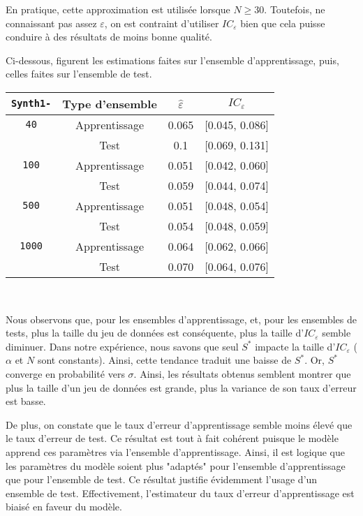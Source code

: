 \documentclass{article}
\begin{document}
\begin{multicols}{2}
En pratique, cette approximation est utilisée lorsque $N \geq 30.$ Toutefois, ne connaissant pas assez $\varepsilon$, on est contraint d'utiliser $IC_\varepsilon$ bien que cela puisse conduire à des résultats de moins bonne qualité.

Ci-dessous, figurent les estimations faites sur l’ensemble d’apprentissage, puis, celles faites sur l’ensemble de test.

{\footnotesize
\begin{center}
\begin{tabular}{| @{}c@{} || @{}c@{} | c | c |}
\hline
\texttt{Synth1-} & Type d'ensemble & $\widehat{\varepsilon}$  & $IC_\varepsilon$  \\
\hline
\hline
\texttt{40} & Apprentissage & 0.065 & [0.045, 0.086] \\
\cline{2-4}
 & Test & 0.1 & [0.069, 0.131] \\
\hline
\hline
\texttt{100} & Apprentissage & 0.051 & [0.042, 0.060] \\
\cline{2-4}
 & Test & 0.059 & [0.044, 0.074] \\
\hline
\hline
\texttt{500} & Apprentissage & 0.051 & [0.048, 0.054] \\
\cline{2-4}
 & Test & 0.054 & [0.048, 0.059] \\
\hline
\hline
\texttt{1000} & Apprentissage & 0.064 & [0.062, 0.066] \\
\cline{2-4}
 & Test & 0.070 & [0.064, 0.076] \\
\hline
\end{tabular}\\ 
\end{center}
}

Nous observons que, pour les ensembles d'apprentissage, et, pour les ensembles de tests, plus la taille du jeu de données est conséquente, plus la taille d'$IC_\varepsilon$ semble diminuer. Dans notre expérience, nous savons que seul $S^{\ast}$ impacte la taille d'$IC_\varepsilon$ ($\alpha$ et $N$ sont constants). Ainsi, cette tendance traduit une baisse de $S^{\ast}$. Or, $S^{\ast}$ converge en probabilité vers $\sigma$. Ainsi, les résultats obtenus semblent montrer que plus la taille d'un jeu de données est grande, plus la variance de son taux d'erreur est basse.

De plus, on constate que le taux d'erreur d'apprentissage semble moins élevé que le taux d'erreur de test. Ce résultat est tout à fait cohérent puisque le modèle apprend ces paramètres via l'ensemble d'apprentissage. Ainsi, il est logique que les paramètres du modèle soient plus "adaptés" pour l'ensemble d'apprentissage que pour l'ensemble de test. Ce résultat justifie évidemment l'usage d'un ensemble de test. Effectivement, l'estimateur du taux d'erreur d'apprentissage est biaisé en faveur du modèle. 


\end{multicols}
\end{document}
